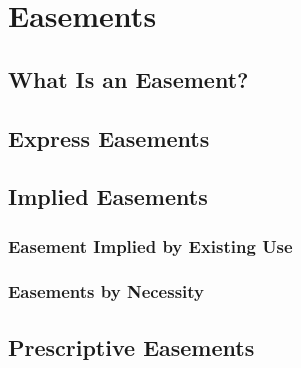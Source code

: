 \chapter{Easements}


\section{What Is an Easement?} 







\section{Express Easements}



\section{Implied Easements}



\subsection{Easement Implied by Existing Use}




\begin{questions}

\end{questions}


\subsection{Easements by Necessity}





\begin{questions}

\end{questions}


\section{Prescriptive Easements}

